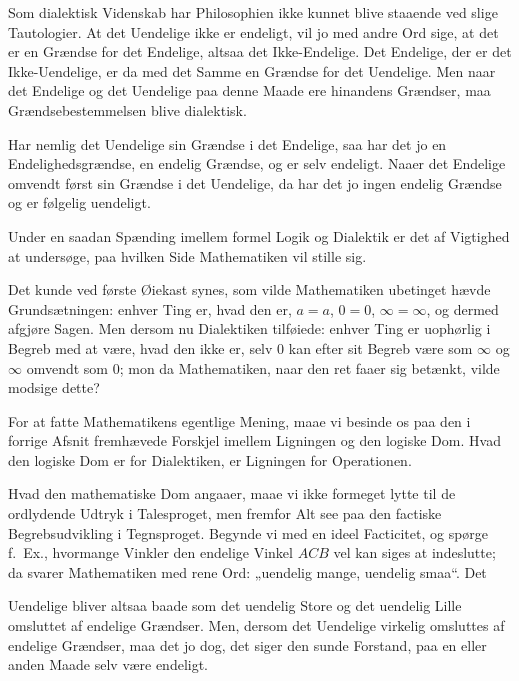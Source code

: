 \documentclass[12pt]{book}
\newcommand{\opage}[1]{\marginnote{\footnotesize\textit{[#1]}}}
\begin{document}
Som dialektisk Videnskab har Philosophien ikke kunnet blive staaende ved slige
Tautologier. At det Uendelige ikke
\opage{22} er endeligt, vil jo med andre Ord sige, at det er en Grændse for det Endelige,
altsaa det Ikke-Endelige. Det Endelige, der er det Ikke-Uendelige, er da med det
Samme en Grændse for det Uendelige. Men naar det Endelige og det Uendelige paa
denne Maade ere hinandens Grændser, maa Grændsebestemmelsen blive dialektisk.

Har nemlig det Uendelige sin Grændse i det Endelige, saa har det jo en
Endelighedsgrændse, en endelig Grændse, og er selv endeligt. Naaer det Endelige
omvendt først sin Grændse i det Uendelige, da har det jo ingen endelig Grændse og
er følgelig uendeligt.

Under en saadan Spænding imellem formel Logik og Dialektik er det af Vigtighed at
undersøge, paa hvilken Side Mathematiken vil stille sig.

Det kunde ved første Øiekast synes, som vilde Mathematiken ubetinget hævde
Grundsætningen: enhver Ting er, hvad den er, $a=a$, $0=0$, $\infty=\infty$, og
dermed afgjøre Sagen. Men dersom nu Dialektiken tilføiede: enhver Ting er
uophørlig i Begreb med at være, hvad den ikke er, selv $0$ kan efter sit Begreb
være som $\infty$ og $\infty$ omvendt som $0$; mon da Mathematiken, naar den ret
faaer sig betænkt, vilde modsige dette?

For at fatte Mathematikens egentlige Mening, maae vi besinde os paa den i forrige
Afsnit fremhævede Forskjel imellem Ligningen og den logiske Dom. Hvad den logiske
Dom er for Dialektiken, er Ligningen for Operationen.

Hvad den mathematiske Dom angaaer, maae vi ikke formeget lytte til de ordlydende
Udtryk i Talesproget, men fremfor Alt see paa den factiske Begrebsudvikling i
Tegnsproget. Begynde vi med en ideel Facticitet, og spørge f.\ Ex., hvormange
Vinkler den endelige Vinkel $ACB$ vel kan siges at indeslutte; da svarer
Mathematiken med rene Ord: „uendelig mange, uendelig smaa“. Det

\begin{center}
\end{center}
\opage{23} Uendelige bliver altsaa baade som det uendelig Store og det uendelig Lille
omsluttet af endelige Grændser. Men, dersom det Uendelige virkelig omsluttes af
endelige Grændser, maa det jo dog, det siger den sunde Forstand, paa en eller
anden Maade selv være endeligt.
\end{document}
